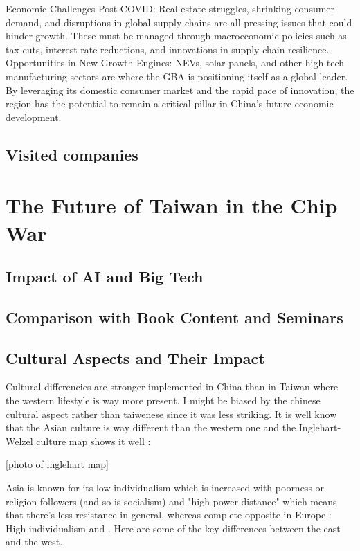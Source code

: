 Economic Challenges Post-COVID: Real estate struggles, shrinking consumer demand, and disruptions in global supply chains are all pressing issues that could hinder growth. These must be managed through macroeconomic policies such as tax cuts, interest rate reductions, and innovations in supply chain resilience.
Opportunities in New Growth Engines: NEVs, solar panels, and other high-tech manufacturing sectors are where the GBA is positioning itself as a global leader. By leveraging its domestic consumer market and the rapid pace of innovation, the region has the potential to remain a critical pillar in China's future economic development.


\subsection{Visited companies}

\newpage
\section{The Future of Taiwan in the Chip War}
\subsection{Impact of AI and Big Tech}


\subsection{Comparison with Book Content and Seminars}




\subsection{Cultural Aspects and Their Impact}
 Cultural differencies are stronger implemented in China than in Taiwan where the western lifestyle is way more present. I might be biased by the chinese cultural aspect rather than taiwenese since it was less striking. It is well know that the Asian culture is way different than the western one and the Inglehart-Welzel culture map shows it well :
        
        [photo of inglehart map]
        
        Asia is known for its low individualism which is increased with poorness or religion followers (and so is socialism) and "high power distance" which means that there's less resistance in general. whereas complete opposite in Europe : High individualism and . Here are some of the key differences between the east and the west. 
        
